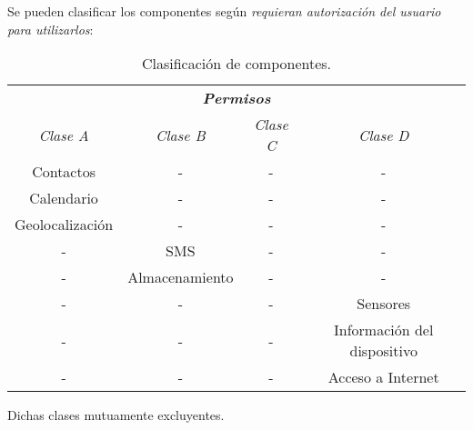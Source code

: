 \begin{frame}
Se pueden clasificar los componentes según \emph{requieran autorización del usuario para utilizarlos}:\pause
  \begin{table}[H]
    \centering
    \begin{small}
	\begin{tabular}{c c c c}
		\hline
		\multicolumn{4}{c}{\emph{\textbf{Permisos}}} \\
		\emph{Clase A} 	& \emph{Clase B}	 & \emph{Clase C}    & \emph{Clase D}\\ \hline \hline
    Contactos    & -    & -    & -\\
    Calendario    & -    & -    & -\\
    Geolocalización    & -    & -    & -\\
    -    & SMS & -    & -\\
    -    & Almacenamiento    & -    & -\\
    -    & -    & -    & Sensores\\
    -    & -    & -    & Información del dispositivo\\
    -    & -    & -    & Acceso a Internet\\ \hline
	\end{tabular}
    \caption{Clasificación de componentes.}
	\end{small}
  \end{table}\pause
  \begin{block}{}\centering
    {Dichas clases mutuamente excluyentes.}  
  \end{block}
\end{frame}